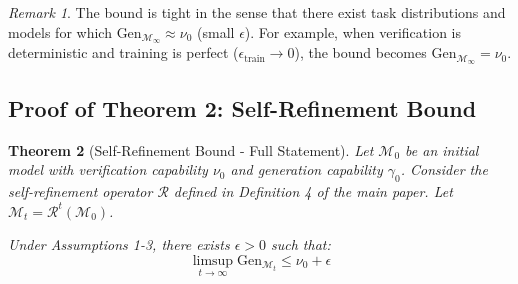 \documentclass{article}
\newtheorem{theorem}{Theorem}
\theoremstyle{definition}
\theoremstyle{remark}
\newtheorem{remark}[theorem]{Remark}
\newcommand{\M}{\mathcal{M}}
\newcommand{\Gen}{\text{Gen}}
\begin{document}
\begin{remark}
The bound is tight in the sense that there exist task distributions and models for which \(\Gen_{\M_\infty} \approx \nu_0\) (small \(\epsilon\)). For example, when verification is deterministic and training is perfect (\(\epsilon_{\text{train}} \to 0\)), the bound becomes \(\Gen_{\M_\infty} = \nu_0\).
\end{remark}

\subsection{Proof of Theorem 2: Self-Refinement Bound}

\begin{theorem}[Self-Refinement Bound - Full Statement]
\label{thm:self-refinement-bound-full}
Let \(\M_0\) be an initial model with verification capability \(\nu_0\) and generation capability \(\gamma_0\). Consider the self-refinement operator \(\mathcal{R}\) defined in Definition 4 of the main paper. Let \(\M_t = \mathcal{R}^t(\M_0)\).

Under Assumptions 1-3, there exists \(\epsilon > 0\) such that:
\[
\limsup_{t \to \infty} \Gen_{\M_t} \leq \nu_0 + \epsilon
\]
\end{theorem}
\end{document}
